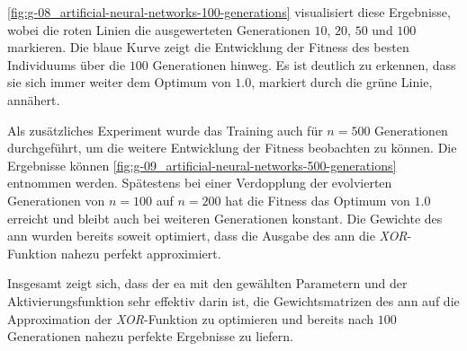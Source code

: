 \pagebreak




\autoref{fig:g-08_artificial-neural-networks-100-generations} visualisiert diese Ergebnisse, wobei die roten Linien die ausgewerteten Generationen $10$, $20$, $50$ und $100$ markieren. Die blaue Kurve zeigt die Entwicklung der Fitness des besten Individuums über die $100$ Generationen hinweg. Es ist deutlich zu erkennen, dass sie sich immer weiter dem Optimum von $1.0$, markiert durch die grüne Linie, annähert.

Als zusätzliches Experiment wurde das Training auch für $n = 500$ Generationen durchgeführt, um die weitere Entwicklung der Fitness beobachten zu können. Die Ergebnisse können \autoref{fig:g-09_artificial-neural-networks-500-generations} entnommen werden. Spätestens bei einer Verdopplung der evolvierten Generationen von $n = 100$ auf $n = 200$ hat die Fitness das Optimum von $1.0$ erreicht und bleibt auch bei weiteren Generationen konstant. Die Gewichte des \Gls{ann} wurden bereits soweit optimiert, dass die Ausgabe des \Gls{ann} die \textit{XOR}-Funktion nahezu perfekt approximiert.

Insgesamt zeigt sich, dass der \Gls{ea} mit den gewählten Parametern und der Aktivierungsfunktion sehr effektiv darin ist, die Gewichtsmatrizen des \Gls{ann} auf die Approximation der \textit{XOR}-Funktion zu optimieren und bereits nach $100$ Generationen nahezu perfekte Ergebnisse zu liefern.